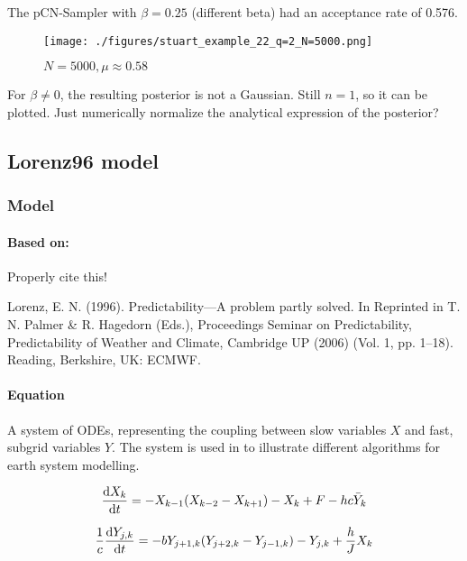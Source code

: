 \documentclass[11pt]{article}
\begin{document}
The pCN-Sampler with \(\beta = 0.25\) (different beta) had an acceptance rate of 0.576.

\begin{figure}[htbp]
\centering
\texttt{[image: ./figures/stuart\_example\_22\_q=2\_N=5000.png]}
\caption{\label{fig:stuart_22_density}
\(N=5000, \mu \approx 0.58\)}
\end{figure}

For \(\beta \neq 0\), the resulting posterior is not a Gaussian. Still \(n=1\), so it can be
plotted. Just numerically normalize the analytical expression of the posterior?

\subsection{Lorenz96 model}
\label{sec:orgc636bbd}
\subsubsection{Model}
\label{sec:org74c84a9}
\paragraph{Based on:}
\label{sec:org0b84536}

Properly cite this!


Lorenz, E. N. (1996). Predictability—A problem partly solved. In Reprinted in T. N. Palmer \& R. Hagedorn (Eds.), Proceedings Seminar on
Predictability, Predictability of Weather and Climate, Cambridge UP (2006) (Vol. 1, pp. 1–18). Reading, Berkshire, UK: ECMWF.

\paragraph{Equation}
\label{sec:org205a2a0}

A system of ODEs, representing the coupling between slow variables \(X\) and fast, subgrid
variables \(Y\). The system is used in \cite{schneider_earth_2017} to illustrate different
algorithms for earth system modelling.

\begin{equation}
\label{eqn:lorenz_X}
  \dv{X_k}{t} =                 - X_{k-1}(X_{k-2} - X_{k+1}) - X_k + F - hc \bar{Y}_k
\end{equation}

\begin{equation}
\label{eqn:lorenz_Y}
  \frac{1}{c} \dv{Y_{j,k}}{t} = -bY_{j+1,k}(Y_{j+2,k} - Y_{j-1, k}) - Y_{j,k} + \frac{h}{J}X_k
\end{equation}
\end{document}
